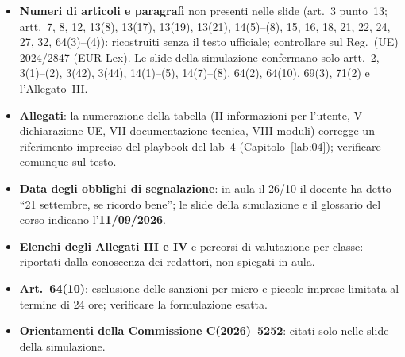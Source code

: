 \begin{verifica}
\begin{itemize}
  \item \textbf{Numeri di articoli e paragrafi} non presenti nelle slide (art.~3 punto~13; artt.~7, 8,
    12, 13(8), 13(17), 13(19), 13(21), 14(5)--(8), 15, 16, 18, 21, 22, 24, 27, 32, 64(3)--(4)): ricostruiti
    senza il testo ufficiale; controllare sul Reg.~(UE) 2024/2847 (EUR-Lex). Le slide della simulazione
    confermano solo artt.~2, 3(1)--(2), 3(42), 3(44), 14(1)--(5), 14(7)--(8), 64(2), 64(10), 69(3), 71(2)
    e l'Allegato~III.
  \item \textbf{Allegati}: la numerazione della tabella (II informazioni per l'utente, V dichiarazione UE,
    VII documentazione tecnica, VIII moduli) corregge un riferimento impreciso del playbook del lab~4
    (Capitolo~\ref{lab:04}); verificare comunque sul testo.
  \item \textbf{Data degli obblighi di segnalazione}: in aula il 26/10 il docente ha detto ``21
    settembre, se ricordo bene''; le slide della simulazione e il glossario del corso indicano
    l'\textbf{11/09/2026}.
  \item \textbf{Elenchi degli Allegati III e IV} e percorsi di valutazione per classe: riportati dalla
    conoscenza dei redattori, non spiegati in aula.
  \item \textbf{Art.~64(10)}: esclusione delle sanzioni per micro e piccole imprese limitata al termine di
    24 ore; verificare la formulazione esatta.
  \item \textbf{Orientamenti della Commissione C(2026)~5252}: citati solo nelle slide della simulazione.
\end{itemize}
\end{verifica}
